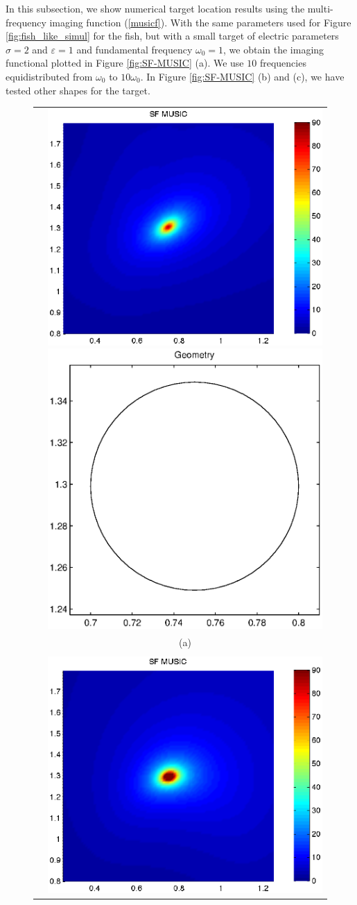 In this subsection, we show numerical target location results
using the multi-frequency imaging function (\ref{musicf}). With
the same parameters used for Figure \ref{fig:fish_like_simul} for
the fish, but with a small target of electric parameters
$\sigma=2$ and $\varepsilon=1$ and fundamental frequency $\omega_0
=1$, we obtain the imaging functional plotted in Figure
\ref{fig:SF-MUSIC} (a). We use $10$ frequencies equidistributed
from $\omega_0$ to $10 \omega_0$. In Figure \ref{fig:SF-MUSIC} (b)
and (c), we have tested other shapes for the target.

\vspace{1cm}

\begin{figure}[!h]
\centering
\begin{tabular}{lc}
 & \includegraphics[width=7.cm]{model/disk.eps} \hspace{0.5cm}
\includegraphics[width=7.cm]{model/disk_geometry.eps}\\
& (a)\\ \tabularnewline  &
\includegraphics[width=7.cm]{model/ellipse.eps}

\end{tabular}
\end{figure}
